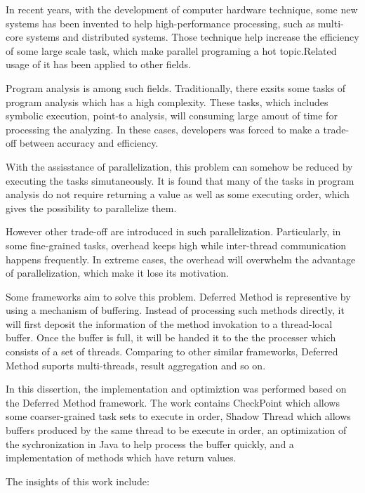 \begin{englishabstract}

In recent years, with the development of computer hardware technique, some new systems has been invented to help high-performance processing, such as multi-core systems and distributed systems. Those technique help increase the efficiency of some large scale task, which make parallel programing a hot topic.Related usage of it has been applied to other fields.

Program analysis is among such fields. Traditionally, there exsits some tasks of program analysis which has a high complexity. These tasks, which includes symbolic execution, point-to analysis, will consuming large amout of time for processing the analyzing. In these cases, developers was forced to make a trade-off between accuracy and efficiency.

With the assisstance of parallelization, this problem can somehow be reduced by executing the tasks simutaneously. It is found that many of the tasks in program analysis do not require returning a value as well as some executing order, which gives the possibility to parallelize them.

However other trade-off are introduced in such parallelization. Particularly, in some fine-grained tasks, overhead keeps high while inter-thread communication happens frequently. In extreme cases, the overhead will overwhelm the advantage of parallelization, which make it lose its motivation.

Some frameworks aim to solve this problem. Deferred Method is representive by using a mechanism of buffering. Instead of processing such methods directly, it will first deposit the information of the method invokation to a thread-local buffer. Once the buffer is full, it will be handed it to the the processer which consists of a set of threads. Comparing to other similar frameworks, Deferred Method suports multi-threads, result aggregation and so on.

In this dissertion, the implementation and optimiztion was performed based on the Deferred Method framework. The work contains CheckPoint which allows some coarser-grained task sets to execute in order, Shadow Thread which allows buffers produced by the same thread to be execute in order, an optimization of the sychronization in Java to help process the buffer quickly, and a implementation of methods which have return values.

The insights of this work include:


\end{englishabstract}
